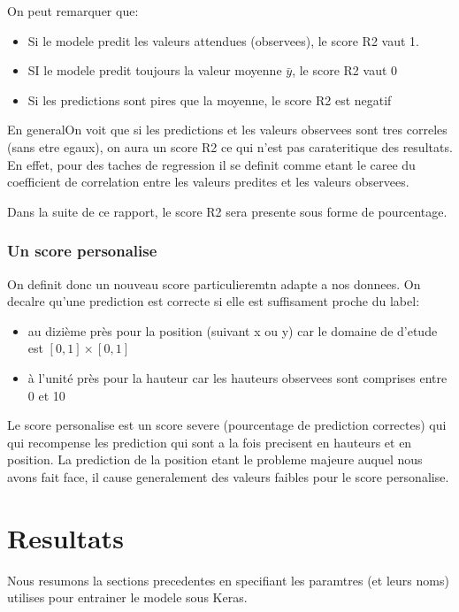 On peut remarquer que:
\begin{itemize}
 \item Si le modele predit les valeurs attendues (observees), le score R2 vaut 1. 
 \item SI le modele predit toujours la valeur moyenne $\bar{y}$, le score R2 vaut 0
 \item Si les predictions sont pires que la moyenne, le score R2 est negatif
\end{itemize}

En generalOn voit que si les predictions et les valeurs observees sont tres correles (sans etre egaux), on aura un score R2 ce qui n'est pas carateritique des resultats. En effet, pour des taches de regression il se definit comme etant le caree du coefficient de correlation entre les valeurs predites et les valeurs observees.

Dans la suite de ce rapport, le score R2 sera presente sous forme de pourcentage. 

\subsubsection{Un score personalise}
On definit donc un nouveau score particulieremtn adapte a nos donnees. On decalre qu'une prediction est correcte si elle est suffisament proche du label:
\begin{itemize}
 \item au dizième près pour la position (suivant x ou y) car le domaine de d'etude est $[0,1] \times [0,1]$
 \item à l'unité près pour la hauteur car les hauteurs observees sont comprises entre 0 et 10
\end{itemize}

Le score personalise est un score severe (pourcentage de prediction correctes) qui qui recompense les prediction qui sont a la fois precisent en hauteurs et en position. La prediction de la position etant le probleme majeure auquel nous avons fait face, il cause generalement des valeurs faibles pour le score personalise.


\section{Resultats}

Nous resumons la sections precedentes en specifiant les paramtres (et leurs noms) utilises pour entrainer le modele sous Keras.

